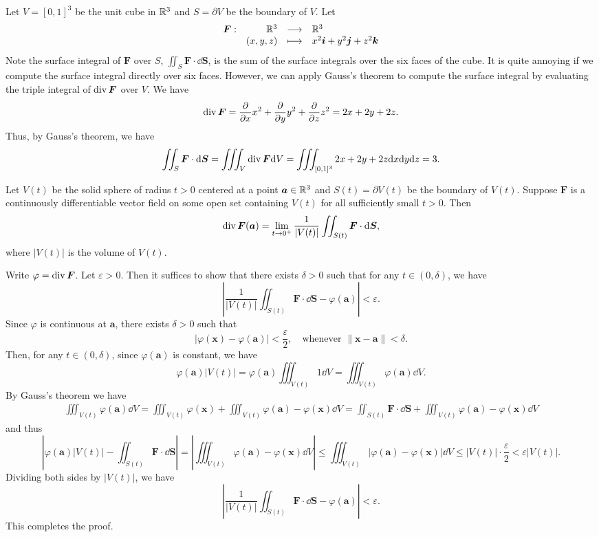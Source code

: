 \begin{exampleenv}
    Let $V = [0,1]^3$ be the unit cube in $\mathbb{R}^3$ and $S = \partial V$ be the boundary of $V$. Let
    $$ \begin{array}{r r c l}
        \bm F:& \mathbb{R}^3 & \longrightarrow & \mathbb{R}^3\\
        & (x,y,z) & \longmapsto & x^2\bm i + y^2\bm j + z^2\bm k
    \end{array}
    $$
    Note the surface integral of $\bm F$ over $S$, $\displaystyle \iint_S \bm F \cdot \dd \bm S$, is the sum of the surface integrals over the six faces of the cube. It is quite annoying if we compute the surface integral directly over six faces. However, we can apply Gauss's theorem to compute the surface integral by evaluating the triple integral of $\operatorname{\mathrm{div}} \bm F$ over $V$. We have
    $$ \operatorname{\mathrm{div}} \bm F = \pdv{x} x^2 + \pdv{y} y^2 + \pdv{z} z^2 = 2x + 2y + 2z. $$
    Thus, by Gauss's theorem, we have
    $$ \iint_S \bm F \cdot \dd \bm S = \iiint_V \operatorname{\mathrm{div}} \bm F \dd V = \iiint_{[0,1]^3} 2x + 2y + 2z \dd x \dd y \dd z = 3. $$
\end{exampleenv}
\begin{corollaryenv}
    Let $V(t)$ be the solid sphere of radius $t>0$ centered at a point $\bm a\in \mathbb{R}^3$ and $S(t) = \partial V(t)$ be the boundary of $V(t)$. Suppose $\bm F$ is a continuously differentiable vector field on some open set containing $V(t)$ for all sufficiently small $t>0$. Then
    $$ \operatorname{\mathrm{div}} \bm F(\bm a) = \lim_{t\to 0^+} \frac{1}{|V(t)|} \iint_{S(t)} \bm F \cdot \dd \bm S,$$
    where $|V(t)|$ is the volume of $V(t)$. 
\end{corollaryenv}
\begin{proofenv}
    Write $\varphi = \operatorname{\mathrm{div}} \bm F$. Let $\varepsilon > 0$. Then it suffices to show that there exists $\delta > 0$ such that for any $t\in (0,\delta)$, we have
    $$ \left| \frac{1}{|V(t)|} \iint_{S(t)} \bm F \cdot \dd \bm S - \varphi(\bm a) \right| < \varepsilon. $$
    Since $\varphi$ is continuous at $\bm a$, there exists $\delta > 0$ such that
    $$ |\varphi(\bm x) - \varphi(\bm a)| < \frac{\varepsilon}{2},\quad \text{whenever } \| \bm x - \bm a \| < \delta. $$
    Then, for any $t\in (0,\delta)$, since $\varphi(\bm a)$ is constant, we have
    $$
    \varphi(\bm a) |V(t)| = \varphi(\bm a) \iiint_{V(t)} 1 \dd V = \iiint_{V(t)} \varphi(\bm a) \dd V.
    $$
    By Gauss's theorem we have
    $$ \begin{aligned}
        \iiint_{V(t)} \varphi(\bm a) \dd V
        =\iiint_{V(t)} \varphi(\bm x) + \iiint_{V(t)} \varphi(\bm a) - \varphi(\bm x) \dd V = \iint_{S(t)} \bm F \cdot \dd \bm S + \iiint_{V(t)} \varphi(\bm a) - \varphi(\bm x) \dd V
    \end{aligned} $$
    and thus
    $$ \left| \varphi(\bm a) |V(t)| - \iint_{S(t)} \bm F \cdot \dd \bm S \right| = \left| \iiint_{V(t)} \varphi(\bm a) - \varphi(\bm x) \dd V \right| \le \iiint_{V(t)} |\varphi(\bm a) - \varphi(\bm x)| \dd V \le |V(t)| \cdot \frac{\varepsilon}{2} < \varepsilon |V(t)|. $$
    Dividing both sides by $|V(t)|$, we have
    $$ \left| \frac{1}{|V(t)|} \iint_{S(t)} \bm F \cdot \dd \bm S - \varphi(\bm a) \right| < \varepsilon. $$
    This completes the proof.
\end{proofenv}
